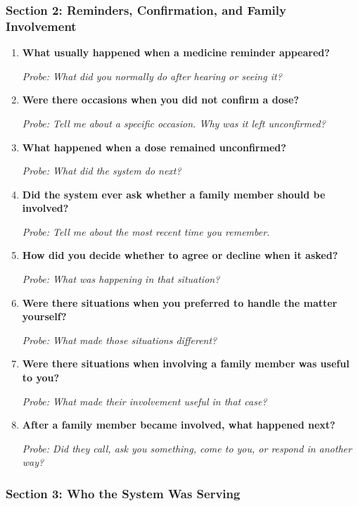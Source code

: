 \subsubsection{Section 2: Reminders, Confirmation, and Family Involvement}

\begin{enumerate}[resume]
  \item \textbf{What usually happened when a medicine reminder appeared?}

  \textit{Probe: What did you normally do after hearing or seeing it?}
  \item \textbf{Were there occasions when you did not confirm a dose?}

  \textit{Probe: Tell me about a specific occasion. Why was it left unconfirmed?}
  \item \textbf{What happened when a dose remained unconfirmed?}

  \textit{Probe: What did the system do next?}
  \item \textbf{Did the system ever ask whether a family member should be involved?}

  \textit{Probe: Tell me about the most recent time you remember.}
  \item \textbf{How did you decide whether to agree or decline when it asked?}

  \textit{Probe: What was happening in that situation?}
  \item \textbf{Were there situations when you preferred to handle the matter yourself?}

  \textit{Probe: What made those situations different?}
  \item \textbf{Were there situations when involving a family member was useful to you?}

  \textit{Probe: What made their involvement useful in that case?}
  \item \textbf{After a family member became involved, what happened next?}

  \textit{Probe: Did they call, ask you something, come to you, or respond in another way?}
\end{enumerate}

\subsubsection{Section 3: Who the System Was Serving}


